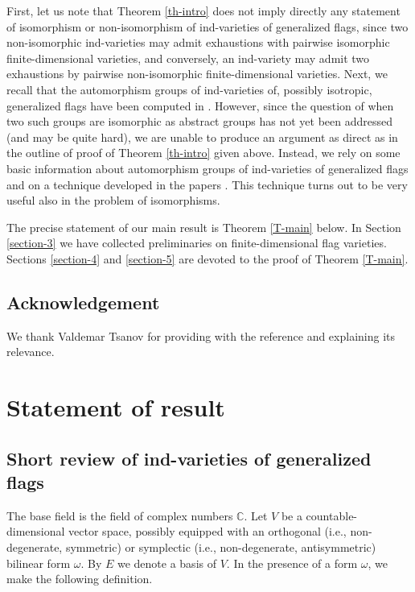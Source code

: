 \documentclass[12pt]{amsart}
\theoremstyle{definition}
\begin{document}
First, let us note that Theorem \ref{th-intro} does not imply directly any statement of isomorphism or non-isomorphism of ind-varieties of generalized flags, since two non-isomorphic ind-varieties may admit exhaustions with pairwise isomorphic finite-dimensional varieties, and conversely, an ind-variety may admit two exhaustions by pairwise non-isomorphic finite-dimensional varieties.
Next, we recall that the automorphism groups of ind-varieties of, possibly isotropic, generalized flags have been computed in \cite{IP}. However, since the question of when two such groups are isomorphic as abstract groups has not yet been addressed (and may be quite hard), we are unable to produce an argument as direct as in the outline of proof of Theorem \ref{th-intro} given above. Instead, we rely on some basic information about automorphism groups of ind-varieties of generalized flags and on a
technique developed in the papers \cite{PT1,PT}. This technique turns out to be very useful also in the problem of isomorphisms.


The precise statement of our main result is Theorem \ref{T-main} below.
In Section \ref{section-3} we have collected preliminaries on finite-dimensional flag varieties. Sections \ref{section-4} and \ref{section-5} are devoted to the proof of Theorem \ref{T-main}.


\subsection*{Acknowledgement} We thank Valdemar Tsanov for providing with the reference \cite{Landsberg-Manivel} and
explaining its relevance.

\section{Statement of result}

\label{section-2}

\subsection{Short review of ind-varieties of generalized flags}

The base field is the field of complex numbers $\mathbb{C}$. Let $V$ be a countable-dimensional vector space, possibly equipped with an orthogonal (i.e., non-degenerate, symmetric) or symplectic (i.e., non-degenerate, antisymmetric) bilinear form $\omega$. By $E$ we denote a basis of $V$. In the presence of a form $\omega$, we make the following definition.
\end{document}

